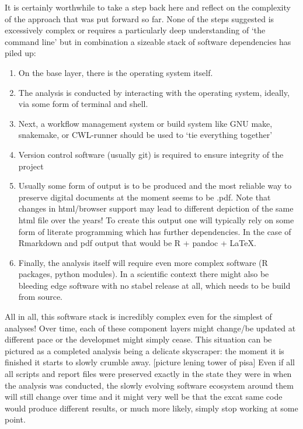 \documentclass[]{book}
\providecommand{\tightlist}{%
  \setlength{\itemsep}{0pt}\setlength{\parskip}{0pt}}
\begin{document}
It is certainly worthwhile to take a step back here and reflect on the
complexity of the approach that was put forward so far. None of the
steps suggested is excessively complex or requires a particularly deep
understanding of `the command line' but in combination a sizeable stack
of software dependencies has piled up:

\begin{enumerate}
\def\labelenumi{\arabic{enumi}.}
\tightlist
\item
  On the base layer, there is the operating system itself.
\item
  The analysis is conducted by interacting with the operating system,
  ideally, via some form of terminal and shell.
\item
  Next, a workflow management system or build system like GNU make,
  snakemake, or CWL-runner should be used to `tie everything together'
\item
  Version control software (usually git) is required to ensure integrity
  of the project
\item
  Usually some form of output is to be produced and the most reliable
  way to preserve digital documents at the moment seems to be .pdf. Note
  that changes in html/browser support may lead to different depiction
  of the same html file over the years! To create this output one will
  typically rely on some form of literate programming which has further
  dependencies. In the case of Rmarkdown and pdf output that would be R
  + pandoc + LaTeX.
\item
  Finally, the analysis itself will require even more complex software
  (R packages, python modules). In a scientific context there might also
  be bleeding edge software with no stabel release at all, which needs
  to be build from source.
\end{enumerate}

All in all, this software stack is incredibly complex even for the
simplest of analyses! Over time, each of these component layers might
change/be updated at different pace or the developmet might simply
cease. This situation can be pictured as a completed analysis being a
delicate skyscraper: the moment it is finished it starts to slowly
crumble away. {[}picture lening tower of pisa{]} Even if all all scripts
and report files were preserved exactly in the state they were in when
the analysis was conducted, the slowly evolving software ecosystem
around them will still change over time and it might very well be that
the excat same code would produce different results, or much more
likely, simply stop working at some point.
\end{document}
